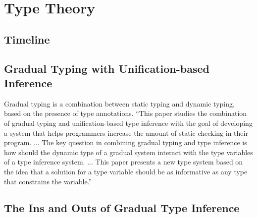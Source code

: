 \chapter {Type Theory}

\section{Timeline}


\section {Gradual Typing with Unification-based Inference \cite{siek2008gradual}}
Gradual typing is a combination between static typing and dynamic typing, based
on the presence of type annotations. ``This paper studies the combination of
gradual typing and unification-based type inference with the goal of developing
a system that helps programmers increase the amount of static checking in their
program. ... The key question in combining gradual typing and type inference is
how should the dynamic type of a gradual system interact with the type variables
of a type inference system. ... This paper presents a new type system based on
the idea that a solution for a type variable should be as informative as any
type that constrains the variable.''

\section {The Ins and Outs of Gradual Type Inference \cite{rastogi2012ins}}